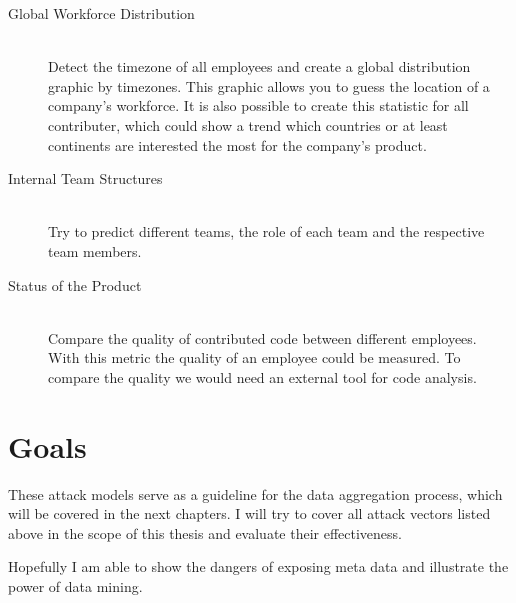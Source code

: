\begin{description}
    \item[Global Workforce Distribution] \hfill \\
        Detect the timezone of all employees and create a global distribution graphic by timezones.
        This graphic allows you to guess the location of a company's workforce.
        It is also possible to create this statistic for all contributer, which could show a trend which countries or at least continents are interested the most for the company's product.

    \item[Internal Team Structures] \hfill \\
        Try to predict different teams, the role of each team and the respective team members.

    \item[Status of the Product] \hfill \\
        Compare the quality of contributed code between different employees.
        With this metric the quality of an employee could be measured.
        To compare the quality we would need an external tool for code analysis.
\end{description}


\section{Goals}
These attack models serve as a guideline for the data aggregation process, which will be covered in the next chapters.
I will try to cover all attack vectors listed above in the scope of this thesis and evaluate their effectiveness.

Hopefully I am able to show the dangers of exposing meta data and illustrate the power of data mining.
